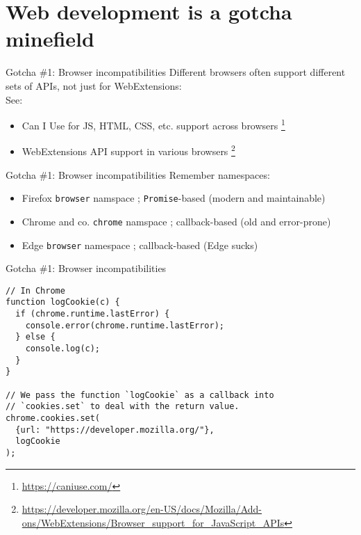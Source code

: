\documentclass[../index.tex]{subfiles}
\begin{document}

\renewcommand{\sectiontitle}{Web development is a gotcha minefield}
\section{\sectiontitle}

\renewcommand{\currenttitle}{Gotcha \#1: Browser incompatibilities}
\begin{frame}[fragile]{\currenttitle}
  Different browsers often support different sets of APIs, not just for
  WebExtensions: \\[2em]

  See:
  \begin{itemize}
    \item Can I Use for JS, HTML, CSS, etc. support across browsers
          \footnote{\scriptsize \url{https://caniuse.com/}}
    \item WebExtensions API support in various browsers
          \footnote{\scriptsize \url{https://developer.mozilla.org/en-US/docs/Mozilla/Add-ons/WebExtensions/Browser_support_for_JavaScript_APIs}}
  \end{itemize}

\end{frame}

\begin{frame}[fragile]{\currenttitle}
  Remember namespaces:
  \begin{itemize}
    \item Firefox \textendash{} \texttt{browser} namspace ;
          \texttt{Promise}-based (modern and maintainable)
    \item Chrome and co. \textendash{} \texttt{chrome} namspace ;
          callback-based (old and error-prone)
    \item Edge \textendash{} \texttt{browser} namespace ;
          callback-based (Edge sucks)
  \end{itemize}
\end{frame}

\begin{frame}[fragile]{\currenttitle}
  \begin{lstlisting}[language=ES6]
// In Chrome
function logCookie(c) {
  if (chrome.runtime.lastError) {
    console.error(chrome.runtime.lastError);
  } else {
    console.log(c);
  }
}

// We pass the function `logCookie` as a callback into 
// `cookies.set` to deal with the return value.
chrome.cookies.set(
  {url: "https://developer.mozilla.org/"},
  logCookie
);
  \end{lstlisting}
\end{frame}
\end{document}
